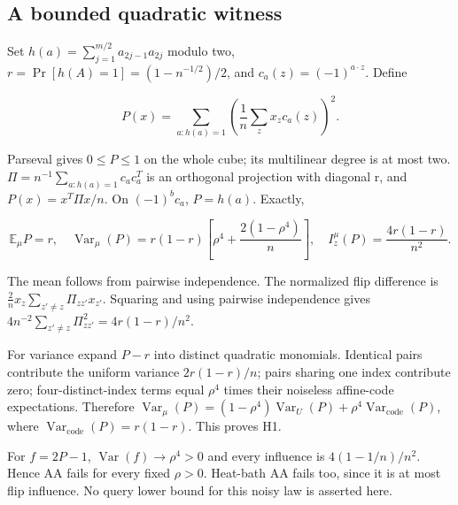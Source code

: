 \subsection{A bounded quadratic
witness}\label{proof:higher_order_obstructions:a-bounded-quadratic-witness}

Set \(h(a)=\sum_{j=1}^{m/2}a_{2j-1}a_{2j}\) modulo two,
\(r = \Pr [h(A)=1] = (1-n^{-1/2})/2\), and \(c_a(z) = (-1)^{a\cdot z}\).
Define

\[
P(x)=\sum_{a:h(a)=1}\left(\frac1n\sum_z x_zc_a(z)\right)^2.
\]

Parseval gives \(0 \le  P \le  1\) on the whole cube; its multilinear
degree is at most two. \(\Pi  = n^{-1}\sum_{a:h(a)=1}c_a c_a^{T}\) is an
orthogonal projection with diagonal r, and \(P(x) = x^{T}\Pi x/n\). On
\((-1)^{b}c_a\), \(P = h(a)\). Exactly,

\[
\mathbb{E}_\mu P=r,\quad
\operatorname{Var}_\mu(P)=r(1-r)\left[\rho^4+\frac{2(1-\rho^4)}n\right],\quad
I_z^\mu(P)=\frac{4r(1-r)}{n^2}. \tag{H1}
\]

The mean follows from pairwise independence. The normalized flip
difference is
\(\frac{2}{n}x_z\sum_{z'\ne z}\Pi_{zz'}x_{z'}\). Squaring
and using pairwise independence gives
\(4n^{-2}\sum_{z'\ne z}\Pi_{zz'}^{2}=4r(1-r)/n^2\).

For variance expand \(P-r\) into distinct quadratic monomials. Identical
pairs contribute the uniform variance \(2r(1-r)/n\); pairs sharing one
index contribute zero; four-distinct-index terms equal \(\rho ^{4}\)
times their noiseless affine-code expectations. Therefore
\(\operatorname{Var}_\mu (P) = (1-\rho ^{4})\operatorname{Var}_U(P)+\rho ^{4}\operatorname{Var}_{\mathrm{code}}(P)\),
where \(\operatorname{Var}_{\mathrm{code}}(P) = r(1-r)\). This proves
H1.

For \(f = 2P-1\), \(\operatorname{Var}(f) \to  \rho ^{4} > 0\) and every
influence is \(4(1-1/n)/n^{2}\). Hence AA fails for every fixed
\(\rho  > 0\). Heat-bath AA fails too, since it is at most flip
influence. No query lower bound for this noisy law is asserted here.
